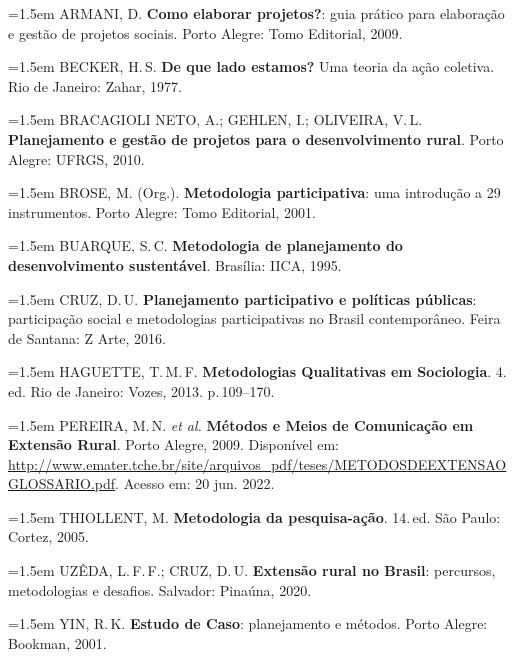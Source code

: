 \documentclass[11pt,a4paper]{article}
\begin{document}
\begin{small}
\hangindent=1.5em
ARMANI, D. \textbf{Como elaborar projetos?}: guia prático para elaboração e gestão de projetos sociais. Porto Alegre: Tomo Editorial, 2009.\par\medskip

\hangindent=1.5em
BECKER, H.\,S. \textbf{De que lado estamos?} Uma teoria da ação coletiva. Rio de Janeiro: Zahar, 1977.\par\medskip

\hangindent=1.5em
BRACAGIOLI NETO, A.; GEHLEN, I.; OLIVEIRA, V.\,L. \textbf{Planejamento e gestão de projetos para o desenvolvimento rural}. Porto Alegre: UFRGS, 2010.\par\medskip

\hangindent=1.5em
BROSE, M. (Org.). \textbf{Metodologia participativa}: uma introdução a 29 instrumentos. Porto Alegre: Tomo Editorial, 2001.\par\medskip

\hangindent=1.5em
BUARQUE, S.\,C. \textbf{Metodologia de planejamento do desenvolvimento sustentável}. Brasília: IICA, 1995.\par\medskip

\hangindent=1.5em
CRUZ, D.\,U. \textbf{Planejamento participativo e políticas públicas}: participação social e metodologias participativas no Brasil contemporâneo. Feira de Santana: Z Arte, 2016.\par\medskip

\hangindent=1.5em
HAGUETTE, T.\,M.\,F. \textbf{Metodologias Qualitativas em Sociologia}. 4.\,ed. Rio de Janeiro: Vozes, 2013. p.\,109--170.\par\medskip

\hangindent=1.5em
PEREIRA, M.\,N. \textit{et al.} \textbf{Métodos e Meios de Comunicação em Extensão Rural}. Porto Alegre, 2009. Disponível em: \url{http://www.emater.tche.br/site/arquivos_pdf/teses/METODOSDEEXTENSAOGLOSSARIO.pdf}. Acesso em: 20 jun. 2022.\par\medskip

\hangindent=1.5em
THIOLLENT, M. \textbf{Metodologia da pesquisa-ação}. 14.\,ed. São Paulo: Cortez, 2005.\par\medskip

\hangindent=1.5em
UZÊDA, L.\,F.\,F.; CRUZ, D.\,U. \textbf{Extensão rural no Brasil}: percursos, metodologias e desafios. Salvador: Pinaúna, 2020.\par\medskip

\hangindent=1.5em
YIN, R.\,K. \textbf{Estudo de Caso}: planejamento e métodos. Porto Alegre: Bookman, 2001.
\end{small}
\end{document}
